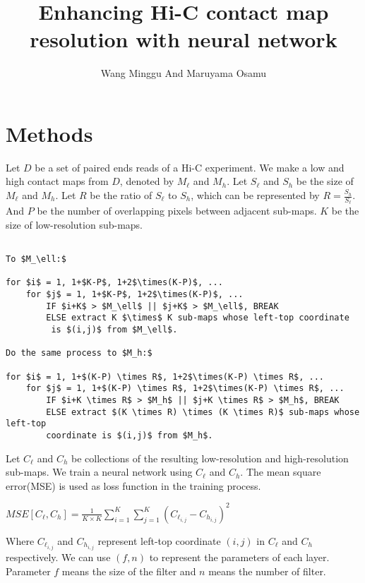 \documentclass{article}
\begin{document}
\title{Enhancing Hi-C contact map resolution with neural network}
\author{Wang Minggu And Maruyama Osamu}
\maketitle



\section{Methods}


Let $D$ be a set of paired ends reads of a Hi-C experiment. 
We make a low and high contact maps from $D$, denoted by $M_\ell$ and $M_h$. 
Let $S_\ell$ and $S_h$ be the size of $M_\ell$ and $M_h$. 
Let $R$ be the ratio of $S_\ell$ to $S_h$, which can be represented by
$R = \frac{S_h}{S_\ell}$. And $P$ be the number of overlapping pixels between adjacent sub-maps.
 $K$ be the size of low-resolution sub-maps.

\begin{Verbatim}[commandchars=\\\{\},codes={\catcode`$=3\catcode`_=8\catcode`^=7}]
% Divide matrices $M_\ell$ and $M_h$ \

To $M_\ell:$

for $i$ = 1, 1+$K-P$, 1+2$\times(K-P)$, ...
    for $j$ = 1, 1+$K-P$, 1+2$\times(K-P)$, ...
        IF $i+K$ > $M_\ell$ || $j+K$ > $M_\ell$, BREAK 
        ELSE extract K $\times$ K sub-maps whose left-top coordinate
         is $(i,j)$ from $M_\ell$.

Do the same process to $M_h:$

for $i$ = 1, 1+$(K-P) \times R$, 1+2$\times(K-P) \times R$, ...
    for $j$ = 1, 1+$(K-P) \times R$, 1+2$\times(K-P) \times R$, ...
        IF $i+K \times R$ > $M_h$ || $j+K \times R$ > $M_h$, BREAK 
        ELSE extract $(K \times R) \times (K \times R)$ sub-maps whose left-top 
        coordinate is $(i,j)$ from $M_h$.
\end{Verbatim}



\noindent Let $C_\ell$ and $C_h$ be collections of the resulting low-resolution and high-resolution
sub-maps. We train a neural network using $C_\ell$ and $C_h$. The mean square error(MSE) is used as 
loss function in the training process. 

\begin{center}
    $MSE[C_\ell, C_h] = \frac{1}{K \times K} \sum_{i=1}^{K} \sum_{j=1}^{K} (C_{\ell_{i,j}}-C_{h_{i,j}})^2$
\end{center}
Where $C_{\ell_{i,j}}$ and $C_{h_{i,j}}$ represent left-top coordinate $(i,j)$ in $C_\ell$ and $C_h$ respectively.
\noindent We can use $(f,n)$ to represent the parameters of each layer. Parameter $f$ means the size of the filter and $n$ means the number of filter. 
\end{document}
